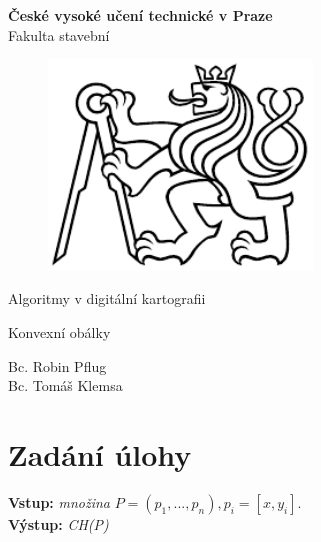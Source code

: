 \documentclass[a4paper, 12pt]{article}
\begin{document}
\begin{titlepage}
\begin{center}
\noindent
\Large \textbf{České vysoké učení technické v Praze }\\ Fakulta stavební
\vspace{5cm}

\huge

\begin{figure}[h!]
	\centering
	\includegraphics[width=7cm]{logo.png}
\end{figure}

\vspace{0.5cm}

Algoritmy v digitální kartografii \\

\vspace{3cm}

\Huge  
Konvexní obálky\\

\vspace{2cm}

\Large
Bc. Robin Pflug \\
Bc. Tomáš Klemsa \\

\end{center}

\end{titlepage}




\pagestyle{plain}     %
\setcounter{page}{1}  %

\tableofcontents
\newpage

\section{Zadání úlohy}

\textbf{Vstup:} \textit{množina} $P=(p_1,...,p_n),p_i=[x,y_i]$.\\
\textbf{Výstup:} 	\textit{CH(P)}\\
\end{document}
